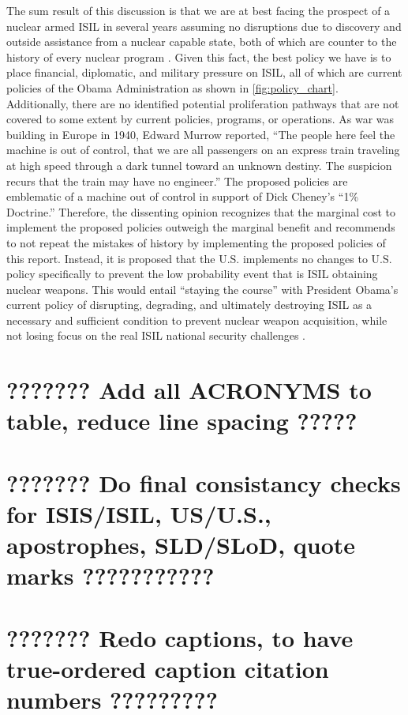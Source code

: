 \documentclass{report}
\begin{document}
The sum result of this discussion is that we are at best facing the prospect of a nuclear armed ISIL in several years assuming no disruptions due to discovery and outside assistance from a nuclear capable state, both of which are counter to the history of every nuclear program \cite{pollack2014unthinkable,Reed2010}.  Given this fact, the best policy we have is to place financial, diplomatic, and military pressure on ISIL, all of which are current policies of the Obama Administration as shown in \autoref{fig:policy_chart}.  Additionally, there are no identified potential proliferation pathways that are not covered to some extent by current policies, programs, or operations.  As war was building in Europe in 1940, Edward Murrow reported, \enquote{The people here feel the machine is out of control, that we are all passengers on an express train traveling at high speed through a dark tunnel toward an unknown destiny.  The suspicion recurs that the train may have no engineer.}  The proposed policies are emblematic of a machine out of control in support of Dick Cheney's \enquote{1\% Doctrine.} Therefore, the dissenting opinion recognizes that the marginal cost to implement the proposed policies outweigh the marginal benefit and recommends to not repeat the mistakes of history by implementing the proposed policies of this report. Instead, it is proposed that the U.S. implements no changes to U.S. policy specifically to prevent the low probability event that is ISIL obtaining nuclear weapons. This would entail \enquote{staying the course} with President Obama's current policy of disrupting, degrading, and ultimately destroying ISIL as a necessary and sufficient condition to prevent nuclear weapon acquisition, while not losing focus on the real ISIL national security challenges \cite{WhiteHouse2014}.


\chapter{???????  Add all ACRONYMS to table, reduce line spacing ?????}

\chapter{???????  Do final consistancy checks for ISIS/ISIL, US/U.S., apostrophes, SLD/SLoD, quote marks  ???????????}



\chapter{???????  Redo captions, to have true-ordered caption citation numbers    ?????????}
\end{document}
